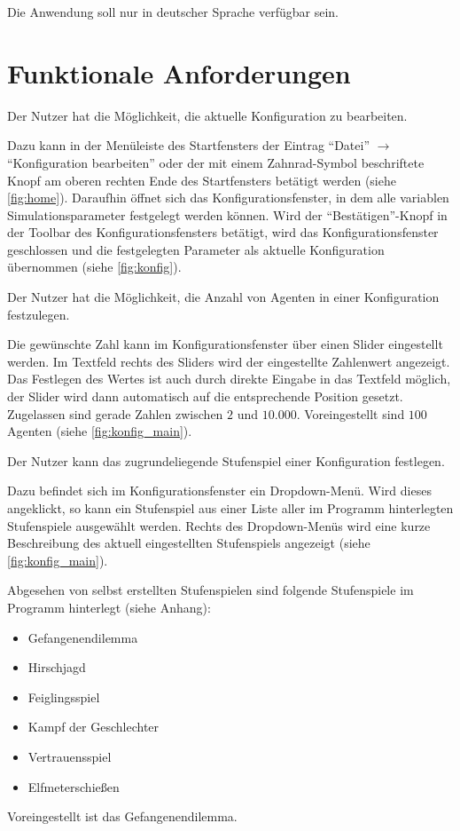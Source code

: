 \documentclass[parskip=full,11pt]{scrartcl}
\begin{document}
Die Anwendung soll nur in deutscher Sprache verfügbar sein.

\pagebreak

\section{Funktionale Anforderungen}

Der \Gls{Nutzer} hat die Möglichkeit, die aktuelle Konfiguration zu bearbeiten.

Dazu kann in der Menüleiste des Startfensters der Eintrag \enquote{Datei} \(\rightarrow\) \enquote{Konfiguration bearbeiten} oder der mit einem Zahnrad-Symbol beschriftete Knopf am oberen rechten Ende des Startfensters betätigt werden (siehe \cref{fig:home}). Daraufhin öffnet sich das Konfigurationsfenster, in dem alle variablen Simulationsparameter festgelegt werden können. Wird der \enquote{Bestätigen}-Knopf in der Toolbar des Konfigurationsfensters betätigt, wird das Konfigurationsfenster geschlossen und die festgelegten Parameter als aktuelle Konfiguration übernommen (siehe \cref{fig:konfig}).

Der \Gls{Nutzer} hat die Möglichkeit, die Anzahl von Agenten in einer Konfiguration festzulegen.

Die gewünschte Zahl kann im Konfigurationsfenster über einen Slider eingestellt werden. Im Textfeld rechts des Sliders wird der eingestellte Zahlenwert angezeigt. Das Festlegen des Wertes ist auch durch direkte Eingabe in das Textfeld möglich, der Slider wird dann automatisch auf die entsprechende Position gesetzt. Zugelassen sind gerade Zahlen zwischen \(2\) und \(10.000\). Voreingestellt sind \(100\) Agenten (siehe \cref{fig:konfig_main}).

Der \Gls{Nutzer} kann das zugrundeliegende Stufenspiel einer Konfiguration festlegen.

Dazu befindet sich im Konfigurationsfenster ein Dropdown-Menü. Wird dieses angeklickt, so kann ein Stufenspiel aus einer Liste aller im Programm hinterlegten Stufenspiele ausgewählt werden. Rechts des Dropdown-Menüs wird eine kurze Beschreibung des aktuell eingestellten Stufenspiels angezeigt (siehe \cref{fig:konfig_main}).

Abgesehen von selbst erstellten Stufenspielen sind folgende Stufenspiele im Programm hinterlegt (siehe Anhang):
\begin{itemize} \itemsep -10pt
\item Gefangenendilemma
\item Hirschjagd
\item Feiglingsspiel
\item Kampf der Geschlechter
\item Vertrauensspiel
\item Elfmeterschießen
\end{itemize}
Voreingestellt ist das Gefangenendilemma.
\end{document}
